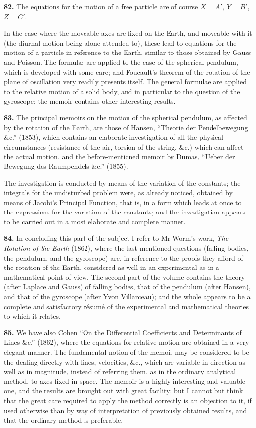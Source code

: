 \documentclass[11pt,a4paper]{book}
\begin{document}
\textbf{82.} The equations for the motion of a free particle are of course $X = A'$, $Y = B'$, $Z = C'$.

In the case where the moveable axes are fixed on the Earth, and moveable with it (the diurnal motion being alone attended to), these lead to equations for the motion of a particle in reference to the Earth, similar to those obtained by Gauss and Poisson. The formul\ae\ are applied to the case of the spherical pendulum, which is developed with some care; and Foucault's theorem of the rotation of the plane of oscillation very readily presents itself. The general formulae are applied to the relative motion of a solid body, and in particular to the question of the gyroscope; the memoir contains other interesting results.

\textbf{83.} The principal memoirs on the motion of the spherical pendulum, as affected by the rotation of the Earth, are those of Hansen, ``Theorie der Pendelbewegung \&c.'' (1853), which contains an elaborate investigation of all the physical circumstances (resistance of the air, torsion of the string, \&c.) which can affect the actual motion, and the before-mentioned memoir by Dumas, ``Ueber der Bewegung des Raumpendels \&c.'' (1855).

The investigation is conducted by means of the variation of the constants; the integrals for the undisturbed problem were, as already noticed, obtained by means of Jacobi's Principal Function, that is, in a form which leads at once to the expressions for the variation of the constants; and the investigation appears to be carried out in a most elaborate and complete manner.

\textbf{84.} In concluding this part of the subject I refer to Mr Worm's work, \textit{The Rotation of the Earth} (1862), where the last-mentioned questions (falling bodies, the pendulum, and the gyroscope) are, in reference to the proofs they afford of the rotation of the Earth, considered as well in an experimental as in a mathematical point of view. The second part of the volume contains the theory (after Laplace and Gauss) of falling bodies, that of the pendulum (after Hansen), and that of the gyroscope (after Yvon Villarceau); and the whole appears to be a complete and satisfactory r\'esum\'e of the experimental and mathematical theories to which it relates.

\textbf{85.} We have also Cohen ``On the Differential Coefficients and Determinants of Lines \&c.'' (1862), where the equations for relative motion are obtained in a very elegant manner. The fundamental notion of the memoir may be considered to be the dealing directly with lines, velocities, \&c., which are variable in direction as well as in magnitude, instead of referring them, as in the ordinary analytical method, to axes fixed in space. The memoir is a highly interesting and valuable one, and the results are brought out with great facility; but I cannot but think that the great care required to apply the method correctly is an objection to it, if used otherwise than by way of interpretation of previously obtained results, and that the ordinary method is preferable.
\end{document}

